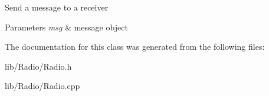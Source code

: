 Send a message to a receiver 
\begin{DoxyParams}{Parameters}
{\em msg} & message object \\
\hline
\end{DoxyParams}


The documentation for this class was generated from the following files\+:\begin{DoxyCompactItemize}
\item 
lib/\+Radio/Radio.\+h\item 
lib/\+Radio/Radio.\+cpp\end{DoxyCompactItemize}
